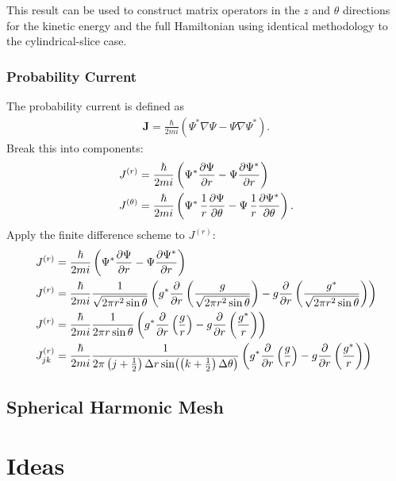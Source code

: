 \documentclass[12pt]{article}
\numberwithin{equation}{section}
\begin{document}
This result can be used to construct matrix operators in the $z$ and $\theta$ directions for the kinetic energy and the full Hamiltonian using identical methodology to the cylindrical-slice case.

\subsubsection{Probability Current}\label{sec:spherical_probability_current}

The probability current is defined as
\begin{align*}
\mathbf{J} = \frac{\hbar}{2m i} \left(\Psi^* \nabla \Psi -\Psi \nabla \Psi^* \right).
\end{align*}
Break this into components:
\begin{align*}
J^{(r)}  &= \frac{\hbar}{2m i} \left(\Psi^* \pdv{\Psi}{r} - \Psi \pdv{\Psi^*}{r} \right) \\
J^{(\theta)}  &= \frac{\hbar}{2m i} \left(\Psi^* \, \frac{1}{r}\pdv{\Psi}{\theta} - \Psi \,  \frac{1}{r}\pdv{\Psi^*}{\theta} \right).
\end{align*}
Apply the finite difference scheme to $J^{(r)}$:
\begin{align*}
J^{(r)} &= \frac{\hbar}{2m i} \left(\Psi^* \pdv{\Psi}{r} - \Psi \pdv{\Psi^*}{r} \right) \\
%
J^{(r)} &= \frac{\hbar}{2m i} \frac{1}{\sqrt{2 \pi r^2 \sin{\theta}}} \left(g^* \pdv{}{r}\left(\frac{g}{\sqrt{2 \pi r^2 \sin{\theta}}}\right) - g \pdv{}{r}\left(\frac{g^*}{\sqrt{2 \pi r^2 \sin{\theta}}}\right) \right) \\
%
J^{(r)} &= \frac{\hbar}{2m i} \frac{1}{2 \pi r \sin{\theta}} \left(g^* \pdv{}{r}\left(\frac{g}{r}\right) - g \pdv{}{r}\left(\frac{g^*}{r}\right) \right) \\
%
J^{(r)}_{jk} &= \frac{\hbar}{2m i} \frac{1}{2 \pi \left(j+\frac{1}{2}\right) \Delta r \sin(\left(k + \frac{1}{2}\right) \Delta \theta)} \left(g^* \pdv{}{r}\left(\frac{g}{r}\right) - g \pdv{}{r}\left(\frac{g^*}{r}\right) \right) \\
\end{align*}

\subsection{Spherical Harmonic Mesh}\label{sec:spherical_harmonics}




\newpage
\section{Ideas}
\end{document}
